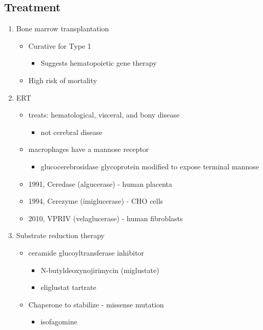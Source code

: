 \documentclass{scrartcl}
\begin{document}
\subsection{Treatment}
\label{sec:orgc0bb8f6}
\begin{enumerate}
\item Bone marrow transplantation
\label{sec:org54d9e63}
\begin{itemize}
\item Curative for Type 1
\begin{itemize}
\item Suggests hematopoietic gene therapy
\end{itemize}
\item High risk of mortality
\end{itemize}
\item ERT
\label{sec:org52328f6}
\begin{itemize}
\item treats: hematological, visceral, and bony disease
\begin{itemize}
\item not cerebral disease
\end{itemize}
\item macrophages have a mannose receptor
\begin{itemize}
\item glucocerebrosidase glycoprotein modified to expose terminal mannose
\end{itemize}
\item 1991, Ceredase (algucerase) - human placenta
\item 1994, Cerezyme (imiglucerase) - CHO cells
\item 2010, VPRIV (velaglucerase) - human fibroblasts
\end{itemize}

\item Substrate reduction therapy
\label{sec:org3a0ae96}
\begin{itemize}
\item ceramide glucoyltransferase inhibitor
\begin{itemize}
\item N-butyldeoxynojirimycin (miglustate)
\item eliglustat tartrate
\end{itemize}
\item Chaperone to stabilize - missense mutation
\begin{itemize}
\item isofagomine
\end{itemize}
\end{itemize}
\end{enumerate}
\end{document}
